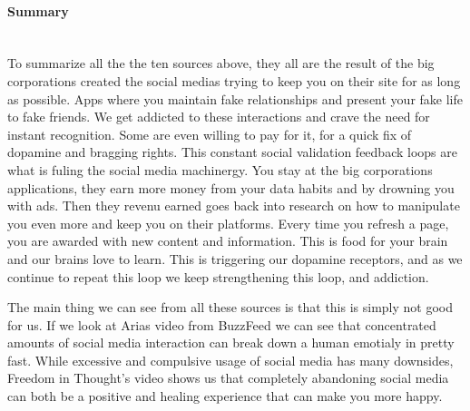\documentclass[11pt]{article}
\begin{document}
\paragraph{Summary} \hspace{0pt} \\
To summarize all the the ten sources above, they all are the result of the big
corporations created the social medias trying to keep you on their site for as long as
possible. Apps where you maintain fake relationships and present your fake life to fake
friends.  We get addicted to these interactions and crave the need for instant
recognition. Some are even willing to pay for it, for a quick fix of dopamine and
bragging rights. This constant social validation feedback loops are what is fuling the
social media machinergy. You stay at the big corporations applications, they earn more
money from your data habits and by drowning you with ads. Then they revenu earned goes
back into research on how to manipulate you even more and keep you on their platforms.
Every time you refresh a page, you are awarded with new content and information. This
is food for your brain and our brains love to learn. This is triggering our dopamine
receptors, and as we continue to repeat this loop we keep strengthening this loop, and
addiction.

The main thing we can see from all these sources is that this is simply not good for us.
If we look at Arias video from BuzzFeed we can see that concentrated amounts of social
media interaction can break down a human emotialy in pretty fast. While excessive and
compulsive usage of social media has many downsides, Freedom in Thought’s video shows
us that completely abandoning social media can both be a positive and healing experience
that can make you more happy.


\pagebreak


\end{document}
